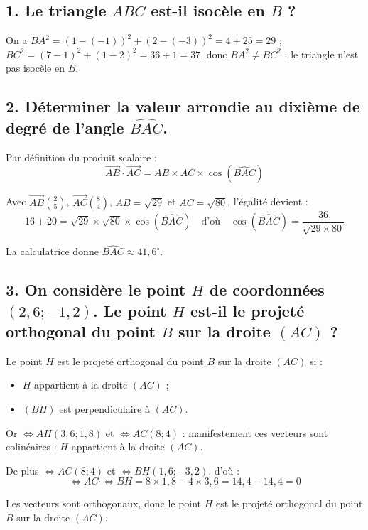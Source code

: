 \subsection*{1. Le triangle $ABC$ est-il isocèle en $B$ ?}
On a $BA^2 = (1 - (-1))^2 + (2 - (-3))^2 = 4 + 25 = 29$ ; $BC^2 = (7 - 1)^2 + (1 - 2)^2 = 36 + 1 = 37$, donc $BA^2 \neq BC^2$ : le triangle n'est pas isocèle en $B$.
	
	\subsection*{2. Déterminer la valeur arrondie au dixième de degré de l'angle $\widehat{BAC}$.}
Par définition du produit scalaire :
	\[
	\overrightarrow{AB} \cdot 	\overrightarrow{AC} = AB \times AC \times \cos(\widehat{BAC})
	\]
	
	Avec $	\overrightarrow{AB}\displaystyle\binom{2}{5}$, $	\overrightarrow{AC}\displaystyle\binom{8}{4}$, $AB = \sqrt{29}$ et $AC = \sqrt{80}$, l'égalité devient :
	\[
	16 + 20 = \sqrt{29} \times \sqrt{80} \times \cos(\widehat{BAC}) \quad \text{d'où} \quad \cos(\widehat{BAC}) = \dfrac{36}{\sqrt{29 \times 80}}
	\]
	
	La calculatrice donne $\widehat{BAC} \approx 41,6^\circ$.
	
	\subsection*{3. On considère le point $H$ de coordonnées $(2,6 ; -1,2)$. Le point $H$ est-il le projeté orthogonal du point $B$ sur la droite $(AC)$ ?}
	
	Le point $H$ est le projeté orthogonal du point $B$ sur la droite $(AC)$ si :
	\begin{itemize}
		\item $H$ appartient à la droite $(AC)$ ;
		\item $(BH)$ est perpendiculaire à $(AC)$.
	\end{itemize}
	
	Or $\iff{AH}(3,6 ; 1,8)$ et $\iff{AC}(8 ; 4)$ : manifestement ces vecteurs sont colinéaires : $H$ appartient à la droite $(AC)$.
	
	De plus $\iff{AC}(8 ; 4)$ et $\iff{BH}(1,6 ; -3,2)$, d'où :
	\[
	\iff{AC} \cdot \iff{BH} = 8 \times 1,8 - 4 \times 3,6 = 14,4 - 14,4 = 0
	\]
	
	Les vecteurs sont orthogonaux, donc le point $H$ est le projeté orthogonal du point $B$ sur la droite $(AC)$.

